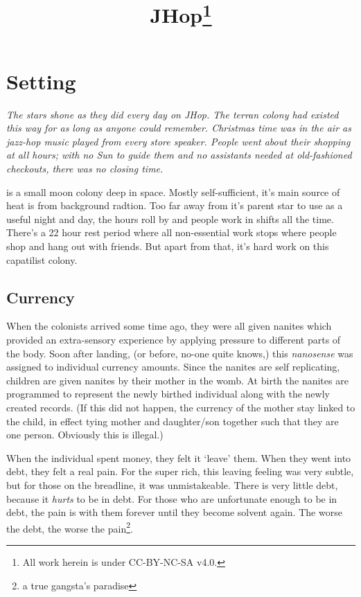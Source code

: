 \documentclass[a4paper,twocolumn]{memoir}
\title{JHop\thanks{\SJGamesOnlinePolicyGameAid{Nathanael Farley} All work herein
  is under CC-BY-NC-SA v4.0.}}
\begin{document}
\maketitle


\chapter{Setting}
\label{cha:setting}
\textit{The stars shone as they did every day on JHop. The terran colony had existed
  this way for as long as anyone could remember. Christmas time was in the air as
  jazz-hop music played from every store speaker. People went about their shopping
  at all hours; with no Sun to guide them and no assistants needed at
  old-fashioned checkouts, there was no closing time.}

\jhop is a small moon colony deep in space. Mostly self-sufficient, it's main
source of heat is from background radtion. Too far away from it's parent star to
use as a useful night and day, the hours roll by and people work in shifts all
the time. There's a 22 hour rest period where all non-essential work stops where
people shop and hang out with friends. But apart from that, it's hard work on
this capatilist colony.

\section{Currency}
\label{sec:currency}

When the colonists arrived some time ago, they were all given nanites which
provided an extra-sensory experience by applying pressure to different parts of
the body. Soon after landing, (or before, no-one quite knows,) this
\emph{nanosense} was assigned to individual currency amounts. Since the nanites
are self replicating, children are given nanites by their mother in the womb. At
birth the nanites are programmed to represent the newly birthed individual along
with the newly created records. (If this did not happen, the currency of the
mother stay linked to the child, in effect tying mother and daughter/son
together such that they are one person. Obviously this is illegal.)

When the individual spent money, they felt it `leave' them. When they went into
debt, they felt a real pain. For the super rich, this leaving feeling was very
subtle, but for those on the breadline, it was unmistakeable. There is very
little debt, because it \emph{hurts} to be in debt. For those who are
unfortunate enough to be in debt, the pain is with them forever until they
become solvent again. The worse the debt, the worse the pain\footnote{a true
  gangsta's paradise}.
\end{document}
